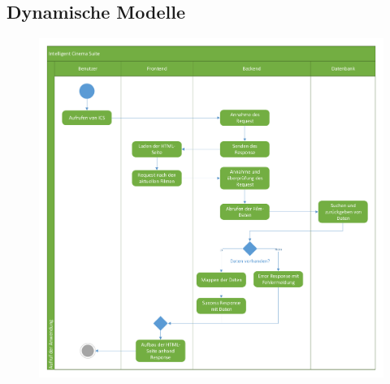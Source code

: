 		\subsection{Dynamische Modelle}
		\begin{figure}[H]
			\centering 
			\includegraphics[width=15cm]{img/adSeitenaufruf.pdf}
			\captionsetup{format=hang}
			\caption[Aktivitätsdiagramm Seitenaufruf]{\label{fig:aktivitätSeitenaufruf}}
		\end{figure}
		
